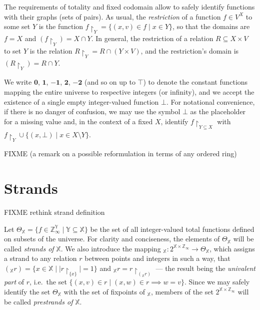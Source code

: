 \documentclass [a4paper,12pt] {article}
\theoremstyle{definition}
\newcommand{\domain}{}
\DeclareRobustCommand{\domain}{\mathop{\textstyle\mathsmaller{\bf {Dom}}}}
\newcommand{\uni}{}
\DeclareRobustCommand{\uni}{{\textstyle\mathlarger{\mathfrak{u}}}}
\begin{document}
The requirements of totality and fixed codomain allow to safely
identify functions with their graphs (sets of pairs).  As usual, the
{\em restriction}\/ of a function $f \in V^X$ to some set $Y$ is the
function $f{\restriction}_Y = \{(x, v) \in f \;|\; x \in Y\}$, so that
the domains are $\domain{f} = X$ and $\domain{(f{\restriction}_Y)} = X
\cap Y$.  In general, the restriction of a relation $R \subseteq X
\times V$ to set $Y$ is the relation $R{\restriction}_Y = R \cap (Y
\times V)$, and the restriction's domain is
$\domain{(R{\restriction}_Y)} = \domain{R} \cap Y$.

We write $\bm{0}$, $\bm{1}$, $\bm{-1}$, $\bm{2}$, $\bm{-2}$ (and so on
up to $\bm{\top}$) to denote the constant functions mapping the entire
universe to respective integers (or infinity), and we accept the
existence of a single empty integer-valued function $\bm{\bot}$.  For
notational convenience, if there is no danger of confusion, we may use
the symbol $\bot$ as the placeholder for a missing value and, in the
context of a fixed $X$, identify $f{\restriction}_{Y{\subseteq}X}$
with $f{\restriction}_Y \cup \{(x, \bot) \;|\; x \in X \setminus Y\}$.

FIXME (a remark on a possible reformulation in terms of any ordered
ring)

\section {Strands}

FIXME rethink strand definition

Let $\Theta_{\mathbb X} = \{f \in {\mathbb Z}_\infty^{\mathbb Y} \;|\;
{\mathbb Y} \subseteq {\mathbb X}\}$ be the set of all integer-valued
total functions defined on subsets of the universe.  For clarity and
conciseness, the elements of $\Theta_{\mathbb X}$ will be called {\em
  strands of}\/ ${\mathbb X}$.  We also introduce the mapping
$\uni_{\mathbb X}\!: 2^{{\mathbb X} \times {\mathbb Z}_\infty}
\rightarrow \Theta_{\mathbb X}$, which assigns a strand to any
relation $r$ between points and integers in such a way, that
$\domain{(\uni_{\mathbb X} r)} = \{x \in {\mathbb X} \;|\;
|r{\restriction}_{\{x\}}| = 1\}$ and $\uni_{\mathbb X} r =
r{\restriction}_{\domain{(\uni_{\mathbb X} r)}}$ --- the result being
the {\em univalent part}\/ of $r$, i.e.\ the set $\{ (x, v) \in r
\;|\; (x, w) \in r \implies w = v\}$.  Since we may safely identify
the set $\Theta_{\mathbb X}$ with the set of fixpoints of
$\uni_{\mathbb X}$, members of the set $2^{{\mathbb X} \times {\mathbb
    Z}_\infty}$ will be called {\em prestrands of}\/ ${\mathbb X}$.
\end{document}

